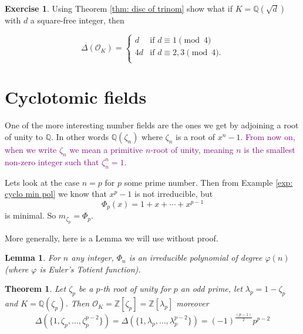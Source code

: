 \documentclass[11pt,a4paper]{report}
\theoremstyle{plain}
\newtheorem{thm}[subsection]{Theorem}
\newtheorem{lem}[subsection]{Lemma}
\theoremstyle{definition}
\theoremstyle{definition}
\newtheorem{question}[subsection]{Exercise}
\newcommand{\ZZ}{\mathbb{Z}}
\def\QQ{\mathbb{Q}}
\def \lam {\lambda}
\def \OO {\mathcal{O}}
\begin{document}
	\begin{question}\label{ques: disc of quad}
		Using Theorem \ref{thm: disc of trinom} show what if $K=\QQ(\sqrt{d})$ with $d$ a square-free integer, then 
		
		\[	\Delta(\OO_K)=
		\begin{cases} 
			d  & \text{if } d \equiv 1 \pmod 4 \\
			4d & \text{if }  d \equiv  2,3 \pmod 4. \\
		\end{cases}
		\]
		
		
	\end{question}
	
	\section{Cyclotomic fields}
	
	One of the more interesting number fields are the ones we get by adjoining a root of unity to $\QQ$. In other words $\QQ(\zeta_n)$ where $\zeta_n$ is a root of $x^n-1$. \textcolor{purple}{From now on, when we write $\zeta_n$ we mean a primitive $n$-root of unity, meaning $n$ is the smallest non-zero integer such that $\zeta_n^n=1$.}
	
	Lets look at the case $n=p$ for $p$ some prime number. Then from Example \ref{exp: cyclo min pol} we know that $x^p-1$ is not irreducible, but \[\Phi_p(x)=1+x+\cdots+x^{p-1}\] is minimal. So $m_{\zeta_p}=\Phi_p$.
	
	
	More generally, here is a Lemma we will use without proof.
	\begin{lem}\label{lem: cyclo poly}
		For $n$ any integer, $\Phi_n$ is an irreducible polynomial of degree $\varphi(n)$ (where $\varphi$ is Euler's Totient function).
	\end{lem}
	
	
	
	
	\begin{thm}\label{thm: ring of ints of cyclo}
		Let $\zeta_p$ be a $p$-th root of unity for $p$ an odd prime, let $\lam_p=1-\zeta_p$ and $K=\QQ(\zeta_p)$. Then $\OO_K=\ZZ[\zeta_p]=\ZZ[\lam_p]$ moreover \[\Delta(\{1,\zeta_p,\dots,\zeta_p^{p-2}\})=\Delta(\{1,\lam_p,\dots,\lam_p^{p-2}\})=(-1)^{\frac{(p-1)}{2}}p^{p-2}\]
	\end{thm}
	
\end{document}
